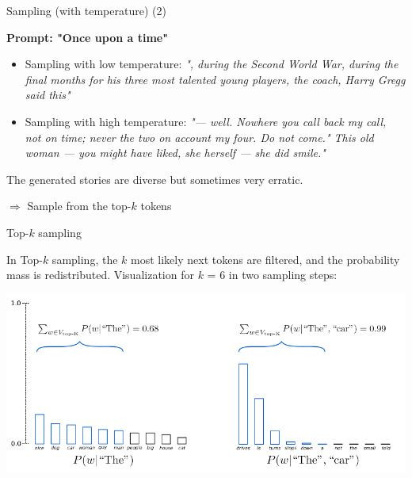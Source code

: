 
\begin{vbframe}{Sampling (with temperature) (2)}

\vfill

\textbf{Prompt: "Once upon a time"}
\begin{itemize}
\item Sampling with low temperature: \textit{", during the Second World War, during the final months for his three most talented young players, the coach, Harry Gregg said this"}
\item Sampling with high temperature: \textit{"— well. Nowhere you call back my call, not on time; never the two on account my four. Do not come." This old woman — you might have liked, she herself — she did smile."}
\end{itemize}

The generated stories are diverse but sometimes very erratic.\\

\vfill

$\Rightarrow$ Sample from the top-$k$ tokens     

\end{vbframe}


\begin{vbframe}{Top-$k$ sampling } 


In Top-$k$ sampling, the $k$ most likely next tokens are filtered, and the probability mass is redistributed.
Visualization for $k$ = 6 in two sampling steps:

\begin{center}
    \includegraphics[width=0.9\linewidth]{figure/top_k.png}
\end{center}


\end{vbframe}

